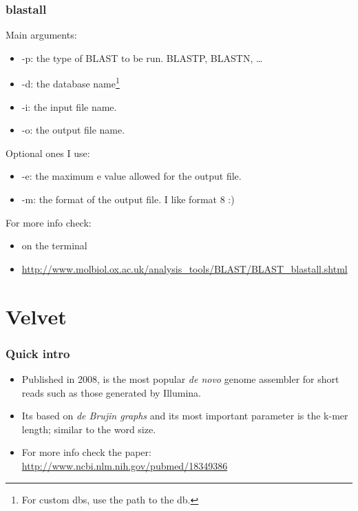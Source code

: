 \begin{frame}[allowframebreaks]
  \frametitle{blastall}
  Main arguments:
  \begin{itemize}
  \item \alert{-p}: the type of BLAST to be run. BLASTP, BLASTN, \ldots
  \item \alert{-d}: the database name\footnote{For custom dbs, use the path to the db.}
  \item \alert{-i}: the input file name.
  \item \alert{-o}: the output file name.
  \end{itemize}
  Optional ones I use:
  \begin{itemize}
  \item \alert{-e}: the maximum e value allowed for the output file.
  \item \alert{-m}: the format of the output file. I like format 8 :) 
  \end{itemize}
  For more info check:
  \begin{itemize}
  \item {} on the terminal
  \item \url{http://www.molbiol.ox.ac.uk/analysis_tools/BLAST/BLAST_blastall.shtml}
  \end{itemize}
\end{frame}

\section{Velvet}
\begin{frame}[allowframebreaks]
  \frametitle{Quick intro}
  \begin{itemize}
  \item Published in 2008,  is the most popular \emph{de novo} genome assembler for short reads such as those generated by Illumina.
  \item Its based on \emph{de Brujin graphs} and its most important parameter is the k-mer length; similar to the word size.
  \item For more info check the paper: \url{http://www.ncbi.nlm.nih.gov/pubmed/18349386}
  \end{itemize}
\end{frame}

